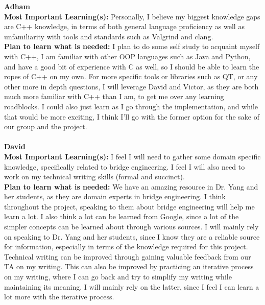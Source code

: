\documentclass[12pt]{article}
\begin{document}
\noindent\textbf{Adham}\\
\textbf{Most Important Learning(s):} Personally, I believe my biggest knowledge gaps are C++ knowledge, in terms of both general language proficiency as well as unfamiliarity
with tools and standards such as Valgrind and clang.\\
\textbf{Plan to learn what is needed:} I plan to do some self study to acquaint myself with C++, I am familiar with other OOP languages such as Java and Python, and have a good
bit of experience with C as well, so I should be able to learn the ropes of C++ on my own. For more specific tools or libraries such as QT, or any other more in depth questions,
I will leverage David and Victor, as they are both much more familiar with C++ than I am, to get me over any learning roadblocks. I could also just learn as I go through the
implementation, and while that would be more exciting, I think I'll go with the former option for the sake of our group and the project.\\\\

\noindent\textbf{David}\\
\textbf{Most Important Learning(s):} I feel I will need to gather some domain specific knowledge, specifically related to bridge engineering. 
I feel I will also need to work on my technical writing skills (formal and succinct). \\
\textbf{Plan to learn what is needed:} We have an amazing resource in Dr. Yang and her students, as they are domain experts in bridge engineering. I think throughout the 
project, speaking to them about bridge engineering will help me learn a lot. I also think a lot can be learned from Google, since a lot of the simpler concepts can be learned 
about through various sources. I will mainly rely on speaking to Dr. Yang and her students, since I know they are a reliable source for information, especially in terms of 
the knowledge required for this project. Technical writing can be improved through gaining valuable feedback from our TA on my writing. This can also be improved
by practicing an iterative process on my writing, where I can go back and try to simplify my writing while maintaining its meaning. I will mainly rely on the latter, since 
I feel I can learn a lot more with the iterative process.\\\\
\end{document}
